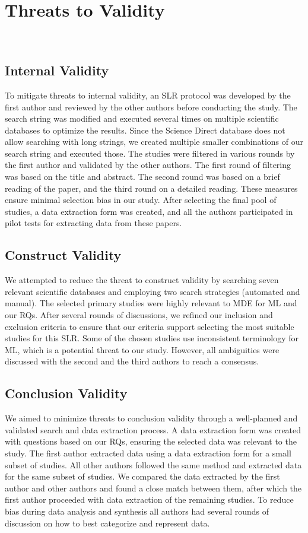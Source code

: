 \section{Threats to Validity}~\label{sec:Threats}

\subsection{Internal Validity}
To mitigate threats to internal validity, an SLR protocol was developed by the first author and reviewed by the other authors before conducting the study. The search string was modified and executed several times on multiple scientific databases to optimize the results. Since the Science Direct database does not allow searching with long strings, we created multiple smaller combinations of our search string and executed those. The studies were filtered in various rounds by the first author and validated by the other authors. The first round of filtering was based on the title and abstract. The second round was based on a brief reading of the paper, and the third round on a detailed reading. These measures ensure minimal selection bias in our study. After selecting the final pool of studies, a data extraction form was created, and all the authors participated in pilot tests for extracting data from these papers. 

\subsection{Construct Validity}
 We attempted to reduce the threat to construct validity by searching seven relevant scientific databases and employing two search strategies (automated and manual). The selected primary studies were highly relevant to MDE for ML and our RQs. After several rounds of discussions, we refined our inclusion and exclusion criteria to ensure that our criteria support selecting the most suitable studies for this SLR. Some of the chosen studies use inconsistent terminology for ML, which is a potential threat to our study. However, all ambiguities were discussed with the second and the third authors to reach a consensus.
 
\subsection{Conclusion Validity}
We aimed to minimize threats to conclusion validity through a well-planned and validated search and data extraction process. A data extraction form was created with questions based on our RQs, ensuring the selected data was relevant to the study. The first author extracted data using a data extraction form for a small subset of studies. All other authors followed the same method and extracted data for the same subset of studies. We compared the data extracted by the first author and other authors and found a close match between them, after which the first author proceeded with data extraction of the remaining studies. To reduce bias during data analysis and synthesis all authors had several rounds of discussion on how to best categorize and represent data.

